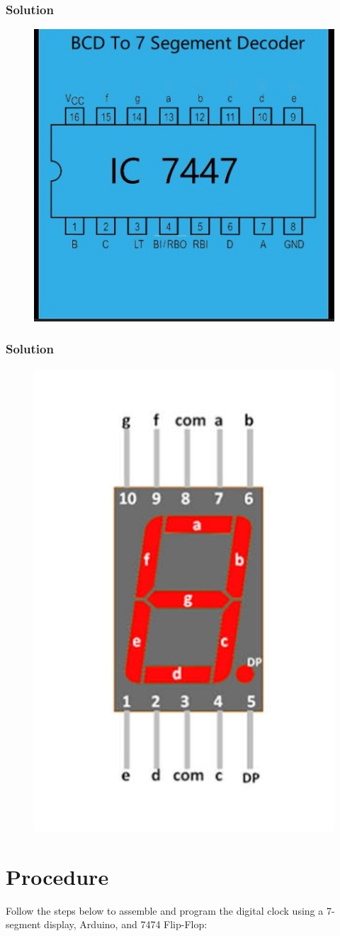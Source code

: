 \documentclass[a4paper,12pt]{article}
\begin{document}
\newpage
\begin{frame}
\frametitle{Solution}
        \begin{figure}[h]
        \centering
       \includegraphics[width=0.5\linewidth]{figs/7474.jpeg}
       \caption{}
       \label{graph}
    \end{figure}

\frametitle{Solution}
        \begin{figure}[h]
        \centering
       \includegraphics[width=0.5\linewidth]{figs/d.jpeg}
       \caption{}
       \label{graph}
    \end{figure}
\end{frame} 


\section{Procedure}

Follow the steps below to assemble and program the digital clock using a 7-segment display, Arduino, and 7474 Flip-Flop:
\end{document}
